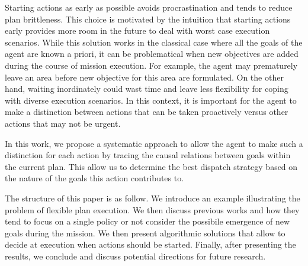 Starting actions as early as possible avoids procrastination and tends
to reduce plan brittleness. This choice
is motivated by the intuition that starting actions early provides more
room in the future to deal with worst case execution scenarios. While
this solution works in the classical case where all the goals of the
agent are known a priori, it can be problematical when new objectives
are added during the course of mission execution. For example, the
agent may prematurely leave an area before new objective for this area
are formulated. On the other hand, waiting inordinately could wast
time and leave less flexibility for coping with diverse execution
scenarios. 
In this context, it is important for the agent to make a distinction
between actions that can be taken proactively versus other actions
that may not be urgent.  

In this work, we propose a systematic approach to allow the agent to
make such a distinction for each action by tracing the causal relations
between goals within the current plan.  This allow us to determine the
best dispatch strategy based on the nature of the goals this action
contributes to.

The structure of this paper is as follow. We introduce an example
illustrating the problem of flexible plan execution. We then discuss
previous works and how they tend to focus on a single policy or not
consider the possibile emergence of new goals during the mission. We
then present algorithmic solutions that allow to decide at execution
when actions should be started. Finally, after presenting the results,
we conclude and discuss potential directions for future research.




